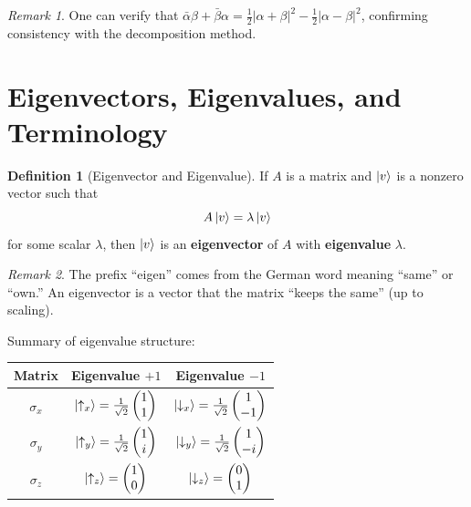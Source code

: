 \documentclass[11pt,a4paper]{article}
\theoremstyle{definition}
\newtheorem{definition}{Definition}[section]
\theoremstyle{plain}
\theoremstyle{remark}
\newtheorem{remark}{Remark}[section]
\begin{document}
\begin{remark}
    One can verify that $\bar{\alpha}\beta + \bar{\beta}\alpha = \frac{1}{2}|\alpha+\beta|^2 - \frac{1}{2}|\alpha-\beta|^2$, confirming consistency with the decomposition method.
\end{remark}

\section{Eigenvectors, Eigenvalues, and Terminology}

\begin{definition}[Eigenvector and Eigenvalue]
    If $A$ is a matrix and $\ket{v}$ is a nonzero vector such that
    \[
        A\ket{v} = \lambda\ket{v}
    \]
    for some scalar $\lambda$, then $\ket{v}$ is an \textbf{eigenvector} of $A$ with \textbf{eigenvalue} $\lambda$.
\end{definition}

\begin{remark}
    The prefix ``eigen'' comes from the German word meaning ``same'' or ``own.'' An eigenvector is a vector that the matrix ``keeps the same'' (up to scaling).
\end{remark}

Summary of eigenvalue structure:
\begin{center}
\renewcommand{\arraystretch}{1.4}
\begin{tabular}{c|c|c}
    \textbf{Matrix} & \textbf{Eigenvalue $+1$} & \textbf{Eigenvalue $-1$} \\ \hline
    $\sigma_x$ & $\ket{\uparrow_x} = \frac{1}{\sqrt{2}}\begin{pmatrix}1\\1\end{pmatrix}$ & $\ket{\downarrow_x} = \frac{1}{\sqrt{2}}\begin{pmatrix}1\\-1\end{pmatrix}$ \\[10pt]
    $\sigma_y$ & $\ket{\uparrow_y} = \frac{1}{\sqrt{2}}\begin{pmatrix}1\\i\end{pmatrix}$ & $\ket{\downarrow_y} = \frac{1}{\sqrt{2}}\begin{pmatrix}1\\-i\end{pmatrix}$ \\[10pt]
    $\sigma_z$ & $\ket{\uparrow_z} = \begin{pmatrix}1\\0\end{pmatrix}$ & $\ket{\downarrow_z} = \begin{pmatrix}0\\1\end{pmatrix}$
\end{tabular}
\end{center}
\end{document}
